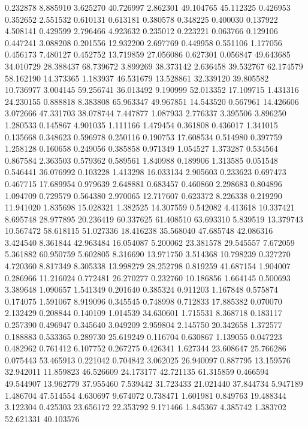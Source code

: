 0.232878
8.885910
3.625270
40.726997
2.862301
49.104765
45.112325
0.426953
0.352652
2.551532
0.610131
0.613181
0.380578
0.348225
0.400030
0.137922
4.508141
0.429599
2.796466
4.923632
0.235012
0.223221
0.063766
0.129106
0.447241
3.088208
0.201556
12.932200
2.697769
0.449958
0.551106
1.177056
0.456173
7.480127
0.452752
13.719859
27.056086
0.627301
0.056847
49.643685
34.010729
28.388437
68.739672
3.899269
38.373142
2.636458
39.532767
62.174579
58.162190
14.373365
1.183937
46.531679
13.528861
32.339120
39.805582
10.736977
3.004145
59.256741
36.013492
9.190999
52.013352
17.109715
1.431316
24.230155
0.888818
8.383808
65.963347
49.967851
14.543520
0.567961
14.426606
3.072666
47.331703
38.078744
7.447877
1.087933
2.776337
3.395506
3.896250
1.280533
0.145867
4.901035
1.111166
1.479454
0.361808
0.436017
1.341015
0.135668
0.348623
0.596978
0.250116
0.190753
17.608534
0.514980
0.397759
1.258128
0.160658
0.249056
0.385858
0.971349
1.054527
1.373287
0.534564
0.867584
2.363503
0.579362
0.589561
1.840988
0.189906
1.313585
0.051548
0.546441
36.076992
0.103228
1.413298
16.033134
2.905603
0.233623
0.697473
0.467715
17.689954
0.979639
2.648881
0.683457
0.460860
2.298683
0.804896
1.094709
0.729579
0.564380
2.970065
12.717607
0.623372
8.226338
0.219290
11.941020
1.835698
15.028321
1.382525
14.307559
0.542082
4.413618
10.337421
8.695748
28.977895
20.236419
60.337625
61.408510
63.693310
5.839519
13.379743
10.567472
58.618115
51.027336
18.416238
35.568040
47.685748
42.086316
3.424540
8.361844
42.963484
16.054087
5.200062
23.381578
29.545557
7.672059
5.361882
60.950759
5.602805
8.316690
13.971750
3.514368
10.798239
0.327270
4.720360
8.817349
8.305338
13.998279
28.252798
0.819259
41.687154
1.904007
0.286966
11.216024
0.772481
26.270277
0.232760
10.186856
1.664145
0.500693
3.389648
1.090657
1.541349
0.201640
0.385324
0.911203
1.167848
0.575874
0.174075
1.591067
8.919096
0.345545
0.748998
0.712833
17.885382
0.070070
2.132429
0.208844
0.140109
1.014539
34.630601
1.715531
8.368718
0.183117
0.257390
0.496947
0.345640
3.049209
2.959804
2.145750
20.342658
1.372577
0.188883
0.533365
0.289730
25.619249
0.116704
0.630867
1.139055
0.047223
0.482962
0.761412
6.107752
0.267275
0.426341
1.627344
23.608647
25.766286
0.075443
53.465913
0.221042
0.704842
3.062025
26.940097
0.887795
13.159576
32.942011
11.859823
46.526609
24.173177
42.721135
61.315859
0.466594
49.544907
13.962779
37.955460
7.539442
31.723433
21.021440
37.844734
5.947189
1.486704
47.514554
4.630697
9.674072
0.738471
1.601981
0.849763
19.488344
3.122304
0.425303
23.656172
22.353792
9.171466
1.845367
4.385742
1.383702
52.621331
40.103576
